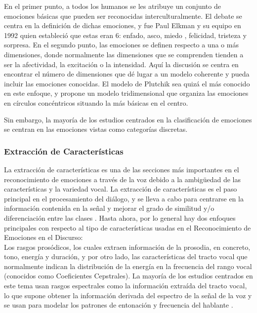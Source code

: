 \documentclass[11pt,a4paper,spanish]{book}
\begin{document}
	En el primer punto, a todos los humanos se les atribuye un conjunto de emociones básicas que pueden ser reconocidas interculturalmente. El debate se centra en la definición de dichas emociones, y fue Paul Elkman y su equipo en 1992 \cite{Ekman1992} quien estableció que estas eran 6: enfado, asco, miedo , felicidad, tristeza y sorpresa.
	En el segundo punto, las emociones se definen respecto a una o más dimensiones, donde normalmente las dimensiones que se comprenden tienden a ser la afectividad, la excitación o la intensidad. Aquí la discusión se centra en encontrar el número de dimensiones que dé lugar a un modelo coherente y pueda incluir las emociones conocidas. El modelo de Plutchik \cite{Plutchik2001} sea quizá el más conocido en este enfoque, y propone un modelo tridimensional que organiza las emociones en círculos concéntricos situando la más básicas en el centro. \hfill \break
	
	Sin embargo, la mayoría de los estudios centrados en la clasificación de emociones se centran en las emociones vistas como categorías discretas.

	\subsubsection{Extracción de Características}
	La extracción de características es una de las secciones más importantes en el reconocimiento de emociones a través de la voz debido a la ambigüedad de las características y la variedad vocal. La extracción de características es el paso principal en el procesamiento del diálogo, y se lleva a cabo para centrarse en la información contenida en la señal y mejorar el grado de similitud y/o diferenciación entre las clases \cite{Hellbernd2016}. Hasta ahora, por lo general hay dos enfoques principales  con respecto al tipo de características usadas en el Reconocimiento de Emociones en el Discurso:\\
	Los rasgos prosódicos, los cuales extraen información de la prosodia, en concreto, tono, energía y duración, y por otro lado, las características del tracto vocal que normalmente indican la distribución de la energía en la frecuencia del rango vocal (conocidos como Coeficientes Cepstrales).
	La mayoría de los estudios centrados en este tema usan rasgos espectrales como la información extraída del tracto vocal, lo que supone obtener la información derivada del espectro de la señal de la voz y se usan para modelar los patrones de entonación y frecuencia del hablante \cite{Langari2020}.\\
	
\end{document}
